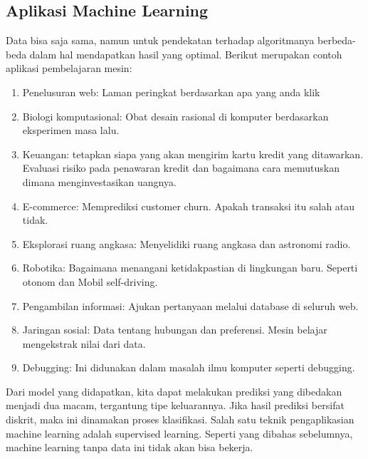 \subsection{Aplikasi Machine Learning} 
Data bisa saja sama, namun untuk pendekatan terhadap algoritmanya berbeda-beda dalam hal  mendapatkan hasil yang optimal. Berikut merupakan contoh aplikasi pembelajaran mesin:
\begin{enumerate}
\item Penelusuran web: Laman peringkat berdasarkan apa yang anda klik
\item Biologi komputasional: Obat desain rasional di komputer berdasarkan eksperimen masa lalu.
\item Keuangan: tetapkan siapa yang akan mengirim kartu kredit yang ditawarkan. Evaluasi risiko pada penawaran kredit dan bagaimana cara memutuskan dimana menginvestasikan uangnya.
\item E-commerce: Memprediksi customer churn. Apakah transaksi itu salah atau tidak.
\item Eksplorasi ruang angkasa: Menyelidiki ruang angkasa dan astronomi radio.
\item Robotika: Bagaimana menangani ketidakpastian di lingkungan baru. Seperti otonom dan Mobil self-driving.
\item Pengambilan informasi: Ajukan pertanyaan melalui database di seluruh web.
\item Jaringan sosial: Data tentang hubungan dan preferensi. Mesin belajar mengekstrak nilai dari data.
\item Debugging: Ini didunakan dalam masalah ilmu komputer seperti debugging.
\end{enumerate}
Dari model yang didapatkan, kita dapat melakukan prediksi yang dibedakan menjadi dua macam, tergantung tipe keluarannya. Jika hasil prediksi bersifat diskrit, maka ini dinamakan proses klasifikasi. Salah satu teknik pengaplikasian machine learning adalah supervised learning. Seperti yang dibahas sebelumnya, machine learning tanpa data ini tidak akan bisa bekerja.
